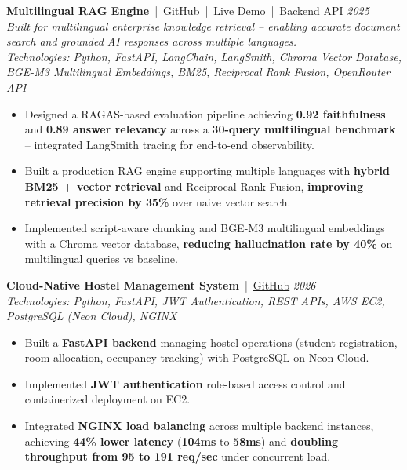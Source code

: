 \documentclass[10pt,a4paper]{article}
\newcommand{\metric}[1]{\textbf{#1}}
\begin{document}
\textbf{Multilingual RAG Engine} \,|\,
\href{https://github.com/raza-shaikh-ai/Rag-systems}{GitHub} \,|\,
\href{https://rag-systems.vercel.app}{Live Demo} \,|\,
\href{https://razashaikh9921-main-dev.hf.space/docs}{Backend API}
\hfill \textit{2025} \\
\textit{Built for multilingual enterprise knowledge retrieval -- enabling accurate document search and grounded AI responses across multiple languages.} \\
\textit{Technologies: Python, FastAPI, LangChain, LangSmith, Chroma Vector Database, BGE-M3 Multilingual Embeddings, BM25, Reciprocal Rank Fusion, OpenRouter API}
\begin{itemize}
    \item Designed a RAGAS-based evaluation pipeline achieving \metric{0.92 faithfulness} and \metric{0.89 answer relevancy} across a \textbf{30-query multilingual benchmark} -- integrated LangSmith tracing for end-to-end observability.
    \item Built a production RAG engine supporting multiple languages with \textbf{hybrid BM25 + vector retrieval} and Reciprocal Rank Fusion, \metric{improving retrieval precision by 35\%} over naive vector search.
    \item Implemented script-aware chunking and BGE-M3 multilingual embeddings with a Chroma vector database, \metric{reducing hallucination rate by 40\%} on multilingual queries vs baseline.
\end{itemize}

\textbf{Cloud-Native Hostel Management System} \,|\,
\href{https://github.com/raza-shaikh-ai/hostel-management-CRUD}{GitHub}
\hfill \textit{2026} \\
\textit{Technologies: Python, FastAPI, JWT Authentication, REST APIs, AWS EC2, PostgreSQL (Neon Cloud), NGINX}
\begin{itemize}
    \item Built a \textbf{FastAPI backend} managing hostel operations (student registration, room allocation, occupancy tracking) with PostgreSQL on Neon Cloud.
    \item Implemented \textbf{JWT authentication} role-based access control and containerized deployment on EC2.
    \item Integrated \textbf{NGINX load balancing} across multiple backend instances, achieving \metric{44\% lower latency} (\metric{104ms} to \metric{58ms}) and \metric{doubling throughput from 95 to 191 req/sec} under concurrent load.
\end{itemize}
\end{document}

